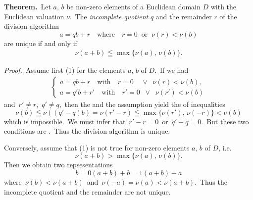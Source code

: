 \documentclass[12pt]{article}
\theoremstyle{definition}
\begin{document}
\textbf{Theorem.}\, Let $a,\,b$ be non-zero elements of a Euclidean domain $D$ with the Euclidean valuation $\nu$.\, The {\em incomplete quotient} $q$ and the remainder $r$ of the division algorithm
$$a = qb+r \quad \mbox{where} \quad r = 0 \;\; \mbox{or}\;\; \nu(r) < \nu(b)$$
are unique if and only if
\begin{align}
\nu(a+b) \leqq \max\{\nu(a),\,\nu(b)\}.
\end{align}

{\em Proof.}\, Assume first (1) for the elements $a,\,b$ of $D$.\, If we had
\begin{align*}
\begin{cases}
a = qb+r \quad \mbox{with} \quad r = 0 \;\;\;\;\lor\;\; \nu(r) < \nu(b),\\
a = q'b+r' \quad \mbox{with} \quad r' = 0 \;\;\lor\;\; \nu(r') < \nu(b)
\end{cases}
\end{align*}
and\, $r' \neq r$,\, $q' \neq q$,\, then the  and the assumption yield the  of inequalities
$$\nu(b) \leqq \nu((q'-q)b) = \nu(r'-r) \leqq \max\{\nu(r'),\,\nu(-r)\} < \nu(b)$$
which is impossible.\, We must infer that\, $r'-r = 0$\, or\, $q'-q = 0$.\, But these two conditions are .\, Thus the division algorithm is unique.

Conversely, assume that (1) is not true for non-zero elements $a,\,b$ of $D$, i.e.
$$\nu(a+b) > \max\{\nu(a),\,\nu(b)\}.$$
Then we obtain two repsesentations
$$b = 0(a+b)+b = 1(a+b)-a$$
where\, $\nu(b) < \nu(a+b)$\, and\, $\nu(-a) = \nu(a) < \nu(a+b)$.\, Thus the incomplete quotient and the remainder are not unique.

\end{document}
